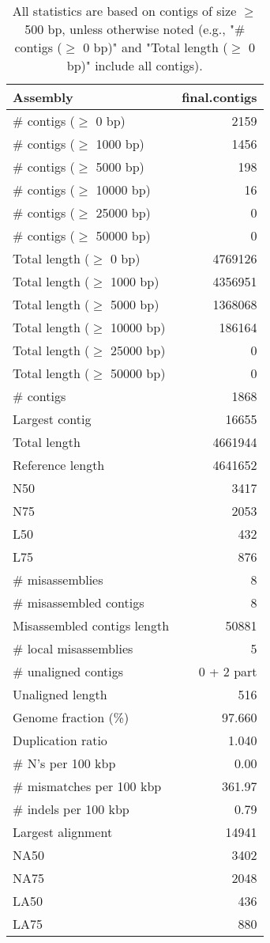 \documentclass[12pt,a4paper]{article}
\begin{document}
\begin{table}[ht]
\begin{center}
\caption{All statistics are based on contigs of size $\geq$ 500 bp, unless otherwise noted (e.g., "\# contigs ($\geq$ 0 bp)" and "Total length ($\geq$ 0 bp)" include all contigs).}
\begin{tabular}{|l*{1}{|r}|}
\hline
Assembly & final.contigs \\ \hline
\# contigs ($\geq$ 0 bp) & 2159 \\ \hline
\# contigs ($\geq$ 1000 bp) & 1456 \\ \hline
\# contigs ($\geq$ 5000 bp) & 198 \\ \hline
\# contigs ($\geq$ 10000 bp) & 16 \\ \hline
\# contigs ($\geq$ 25000 bp) & 0 \\ \hline
\# contigs ($\geq$ 50000 bp) & 0 \\ \hline
Total length ($\geq$ 0 bp) & 4769126 \\ \hline
Total length ($\geq$ 1000 bp) & 4356951 \\ \hline
Total length ($\geq$ 5000 bp) & 1368068 \\ \hline
Total length ($\geq$ 10000 bp) & 186164 \\ \hline
Total length ($\geq$ 25000 bp) & 0 \\ \hline
Total length ($\geq$ 50000 bp) & 0 \\ \hline
\# contigs & 1868 \\ \hline
Largest contig & 16655 \\ \hline
Total length & 4661944 \\ \hline
Reference length & 4641652 \\ \hline
N50 & 3417 \\ \hline
N75 & 2053 \\ \hline
L50 & 432 \\ \hline
L75 & 876 \\ \hline
\# misassemblies & 8 \\ \hline
\# misassembled contigs & 8 \\ \hline
Misassembled contigs length & 50881 \\ \hline
\# local misassemblies & 5 \\ \hline
\# unaligned contigs & 0 + 2 part \\ \hline
Unaligned length & 516 \\ \hline
Genome fraction (\%) & 97.660 \\ \hline
Duplication ratio & 1.040 \\ \hline
\# N's per 100 kbp & 0.00 \\ \hline
\# mismatches per 100 kbp & 361.97 \\ \hline
\# indels per 100 kbp & 0.79 \\ \hline
Largest alignment & 14941 \\ \hline
NA50 & 3402 \\ \hline
NA75 & 2048 \\ \hline
LA50 & 436 \\ \hline
LA75 & 880 \\ \hline
\end{tabular}
\end{center}
\end{table}
\end{document}
